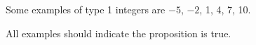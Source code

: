 

\begin{list}{\bf{\ref{exer:sec12-type}.}} 
\item \begin{list}{\bf{(a)}}
\item  Some examples of type 1 integers are $-5$, $-2$, 1, 4, 7, 10.
\end{list}
\end{list}



\begin{list}{}
\item \begin{list}{\bf{(c)}}
\item All examples should indicate the proposition is true.
\end{list}
\end{list}


